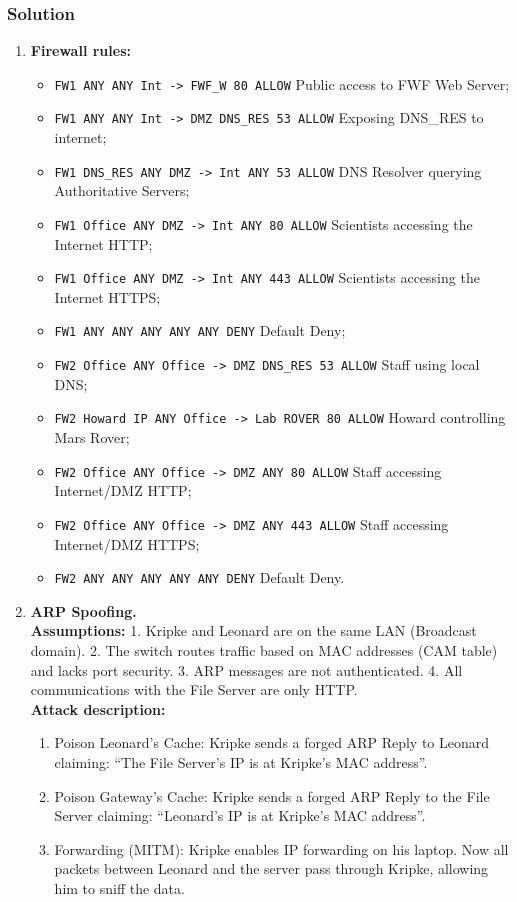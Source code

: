 \documentclass{article}
\begin{document}
\subsubsection*{Solution}
\begin{enumerate}
    \item[\textbf{1.}] \textbf{Firewall rules:}
    \begin{itemize}
        \item \texttt{FW1 ANY ANY Int -> FWF\_W 80 ALLOW} Public access to FWF Web Server;
        \item \texttt{FW1 ANY ANY Int -> DMZ DNS\_RES 53 ALLOW} Exposing DNS\_RES to internet;
        \item \texttt{FW1 DNS\_RES ANY DMZ -> Int ANY 53 ALLOW} DNS Resolver querying Authoritative Servers;
        \item \texttt{FW1 Office ANY DMZ -> Int ANY 80 ALLOW} Scientists accessing the Internet HTTP;
        \item \texttt{FW1 Office ANY DMZ -> Int ANY 443 ALLOW} Scientists accessing the Internet HTTPS;
        \item \texttt{FW1 ANY ANY ANY ANY ANY DENY} Default Deny;
        \item \texttt{FW2 Office ANY Office -> DMZ DNS\_RES 53 ALLOW} Staff using local DNS;
        \item \texttt{FW2 Howard IP ANY Office -> Lab ROVER 80 ALLOW} Howard controlling Mars Rover;
        \item \texttt{FW2 Office ANY Office -> DMZ ANY 80 ALLOW} Staff accessing Internet/DMZ HTTP;
        \item \texttt{FW2 Office ANY Office -> DMZ ANY 443 ALLOW} Staff accessing Internet/DMZ HTTPS;
        \item \texttt{FW2 ANY ANY ANY ANY ANY DENY} Default Deny.
    \end{itemize}

    \item[\textbf{2.}] \textbf{ARP Spoofing.} \\
    \textbf{Assumptions:} 1. Kripke and Leonard are on the same LAN (Broadcast domain). 2. The switch routes traffic based on MAC addresses (CAM table) and lacks port security. 3. ARP messages are not authenticated. 4. All communications with the File Server are only HTTP. \\
    \textbf{Attack description:} 
    \begin{enumerate}
        \item Poison Leonard's Cache: Kripke sends a forged ARP Reply to Leonard claiming: ``The File Server's IP is at Kripke's MAC address''. 
        \item Poison Gateway's Cache: Kripke sends a forged ARP Reply to the File Server claiming: ``Leonard's IP is at Kripke's MAC address''. 
        \item Forwarding (MITM): Kripke enables IP forwarding on his laptop. Now all packets between Leonard and the server pass through Kripke, allowing him to sniff the data.
    \end{enumerate}


\end{enumerate}
\end{document}
